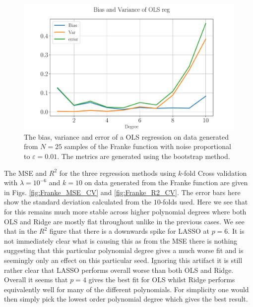 \documentclass[%
reprint,
amsmath,amssymb,
aps,
pra,
]{revtex4-2}
\begin{document}
\begin{figure}[ht!]
	\centering
	\includegraphics[width=\linewidth]{Python/Figures/OLS/OLS_Bootstrap_BiasVar_no_scaling_GOOD.pdf}
	\caption{The bias, variance and error of a OLS regression on data generated from \(N=25\) samples of the Franke function with noise proportional to \(\varepsilon=0.01\). The metrics are generated using the bootstrap method.}
	\label{fig:bootstrap}
\end{figure}
The MSE and $R^2$ for the three regression methods using $k$-fold Cross validation with \(\lambda=10^{-6}\) and $k=10$ on data generated from the Franke function are given in Figs. \ref{fig:Franke_MSE_CV} and \ref{fig:Franke_R2_CV}. The error bars here show the standard deviation calculated from the $10$-folds used. Here we see that for this remains much more stable across higher polynomial degrees where both OLS and Ridge are mostly flat throughout unlike in the previous cases. We see that in the $R^2$ figure that there is a downwards spike for LASSO at $p=6$. It is not immediately clear what is causing this as from the MSE there is nothing suggesting that this particular polynomial degree gives a much worse fit and is seemingly only an effect on this particular seed. Ignoring this artifact it is still rather clear that LASSO performs overall worse than both OLS and Ridge. Overall it seems that $p=4$ gives the best fit for OLS whilst Ridge performs equivalently well for many of the different polynomials. For simplicity one would then simply pick the lowest order polynomial degree which gives the best result.
\end{document}
